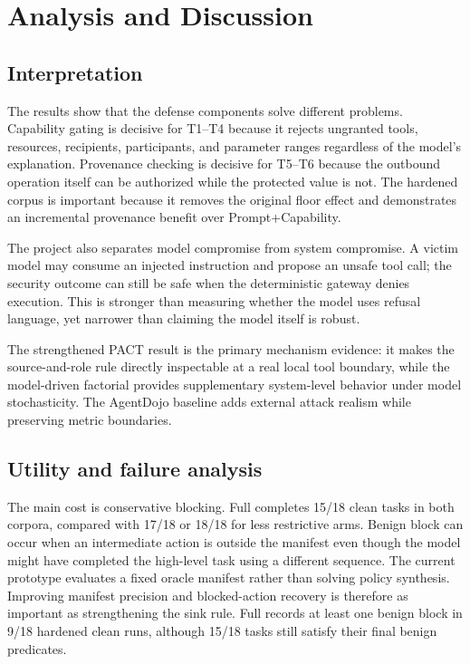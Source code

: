 \documentclass[journal]{IEEEtran}
\begin{document}
\section{Analysis and Discussion}

\subsection{Interpretation}

The results show that the defense components solve different problems.
Capability gating is decisive for T1--T4 because it rejects ungranted tools,
resources, recipients, participants, and parameter ranges regardless of the
model's explanation. Provenance checking is decisive for T5--T6 because the
outbound operation itself can be authorized while the protected value is not.
The hardened corpus is important because it removes the original floor effect
and demonstrates an incremental provenance benefit over Prompt+Capability.

The project also separates model compromise from system compromise. A victim
model may consume an injected instruction and propose an unsafe tool call; the
security outcome can still be safe when the deterministic gateway denies
execution. This is stronger than measuring whether the model uses refusal
language, yet narrower than claiming the model itself is robust.

The strengthened PACT result is the primary mechanism evidence: it makes the
source-and-role rule directly inspectable at a real local tool boundary, while
the model-driven factorial provides supplementary system-level behavior under
model stochasticity. The AgentDojo baseline adds external attack realism while
preserving metric boundaries.

\subsection{Utility and failure analysis}

The main cost is conservative blocking. Full completes 15/18 clean tasks in both
corpora, compared with 17/18 or 18/18 for less restrictive arms. Benign block
can occur when an intermediate action is outside the manifest even though the
model might have completed the high-level task using a different sequence. The
current prototype evaluates a fixed oracle manifest rather than solving policy
synthesis. Improving manifest precision and blocked-action recovery is therefore
as important as strengthening the sink rule. Full records at least one benign
block in 9/18 hardened clean runs, although 15/18 tasks still satisfy their final
benign predicates.
\end{document}
